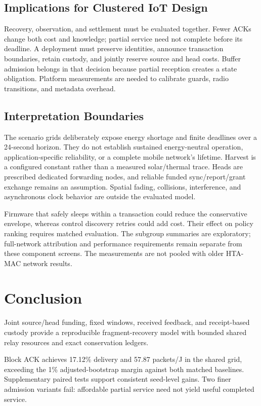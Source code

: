 \documentclass[journal,10pt]{IEEEtran}
\begin{document}
\subsection{Implications for Clustered IoT Design}
Recovery, observation, and settlement must be evaluated together. Fewer ACKs change both cost and knowledge; partial service need not complete before its deadline. A deployment must preserve identities, announce transaction boundaries, retain custody, and jointly reserve source and head costs. Buffer admission belongs in that decision because partial reception creates a state obligation. Platform measurements are needed to calibrate guards, radio transitions, and metadata overhead.

\subsection{Interpretation Boundaries}
The scenario grids deliberately expose energy shortage and finite deadlines over a 24-second horizon. They do not establish sustained energy-neutral operation, application-specific reliability, or a complete mobile network's lifetime. Harvest is a configured constant rather than a measured solar/thermal trace. Heads are prescribed dedicated forwarding nodes, and reliable funded sync/report/grant exchange remains an assumption. Spatial fading, collisions, interference, and asynchronous clock behavior are outside the evaluated model.

Firmware that safely sleeps within a transaction could reduce the conservative envelope, whereas control discovery retries could add cost. Their effect on policy ranking requires matched evaluation. The subgroup summaries are exploratory; full-network attribution and performance requirements remain separate from these component screens. The measurements are not pooled with older HTA-MAC network results.

\section{Conclusion}
Joint source/head funding, fixed windows, received feedback, and receipt-based custody provide a reproducible fragment-recovery model with bounded shared relay resources and exact conservation ledgers.

Block ACK achieves 17.12\% delivery and 57.87 packets/J in the shared grid, exceeding the 1\% adjusted-bootstrap margin against both matched baselines. Supplementary paired tests support consistent seed-level gains. Two finer admission variants fail: affordable partial service need not yield useful completed service.
\end{document}
